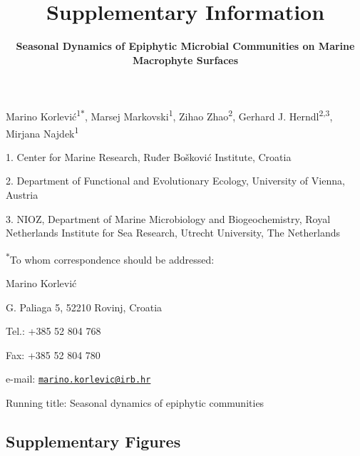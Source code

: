 \documentclass[12pt,]{article}
\title{\textbf{Supplementary Information}}
\subtitle{\textbf{Seasonal Dynamics of Epiphytic Microbial Communities on Marine
Macrophyte Surfaces}}
\author{}
\date{}
\begin{document}
\maketitle

\vspace{20mm}

Marino Korlević\textsuperscript{1\(*\)}, Marsej
Markovski\textsuperscript{1}, Zihao Zhao\textsuperscript{2}, Gerhard J.
Herndl\textsuperscript{2,3}, Mirjana Najdek\textsuperscript{1}

1. Center for Marine Research, Ruđer Bošković Institute, Croatia

2. Department of Functional and Evolutionary Ecology, University of
Vienna, Austria

3. NIOZ, Department of Marine Microbiology and Biogeochemistry, Royal
Netherlands Institute for Sea Research, Utrecht University, The
Netherlands

\textsuperscript{\(*\)}To whom correspondence should be addressed:

Marino Korlević

G. Paliaga 5, 52210 Rovinj, Croatia

Tel.: +385 52 804 768

Fax: +385 52 804 780

e-mail:
\href{mailto:marino.korlevic@irb.hr}{\nolinkurl{marino.korlevic@irb.hr}}

Running title: Seasonal dynamics of epiphytic communities

\setlength\parindent{24pt}

\hypertarget{supplementary-figures}{%
\subsection{Supplementary Figures}\label{supplementary-figures}}
\end{document}
